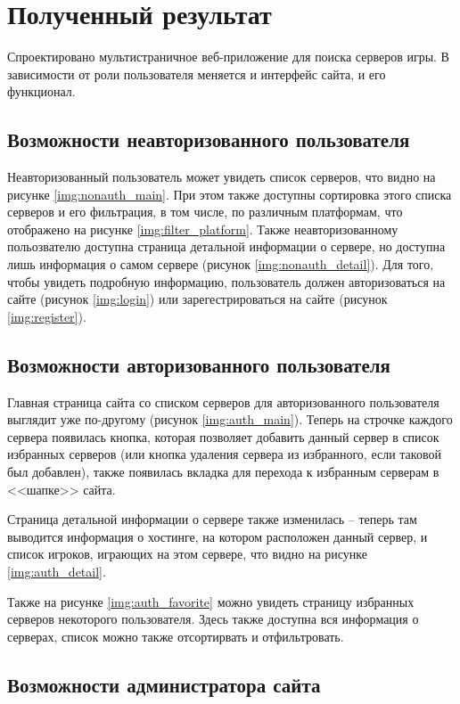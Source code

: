 \section{Полученный результат}

Спроектировано мультистраничное веб-приложение для поиска серверов игры. В зависимости от роли пользователя меняется и интерфейс сайта, и его функционал.

\subsection{Возможности неавторизованного пользователя}

Неавторизованный пользователь может увидеть список серверов, что видно на рисунке \ref{img:nonauth_main}. При этом также доступны сортировка этого списка серверов и его фильтрация, в том числе, по различным платформам, что отображено на рисунке \ref{img:filter_platform}. Также неавторизованному польозвателю доступна страница детальной информации о сервере, но доступна лишь информация о самом сервере (рисунок \ref{img:nonauth_detail}). Для того, чтобы увидеть подробную информацию, пользователь должен авторизоваться на сайте (рисунок \ref{img:login}) или зарегестрироваться на сайте (рисунок \ref{img:register}).

\subsection{Возможности авторизованного пользователя}

Главная страница сайта со списком серверов для авторизованного пользователя выглядит уже по-другому (рисунок \ref{img:auth_main}). Теперь на строчке каждого сервера появилась кнопка, которая позволяет добавить данный сервер в список избранных серверов (или кнопка удаления сервера из избранного, если таковой был добавлен), также появилась вкладка для перехода к избранным серверам в <<шапке>> сайта.

Страница детальной информации о сервере также изменилась -- теперь там выводится информация о хостинге, на котором расположен данный сервер, и список игроков, играющих на этом сервере, что видно на рисунке \ref{img:auth_detail}.

Также на рисунке \ref{img:auth_favorite} можно увидеть страницу избранных серверов некоторого пользователя. Здесь также доступна вся информация о серверах, список можно также отсортирвать и отфильтровать.

\subsection{Возможности администратора сайта}

